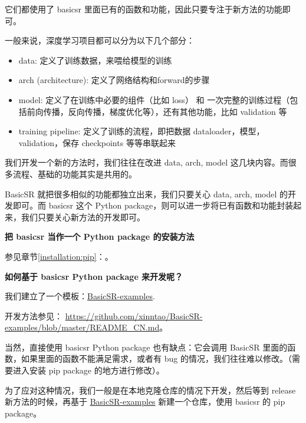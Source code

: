 \documentclass[../main.tex]{subfiles}
\begin{document}
它们都使用了 basicsr 里面已有的函数和功能，因此只要专注于新方法的功能即可。

一般来说，深度学习项目都可以分为以下几个部分：
\begin{itemize}
	\item data: 定义了训练数据，来喂给模型的训练
	\item arch (architecture): 定义了网络结构和forward的步骤
	\item model: 定义了在训练中必要的组件（比如 loss） 和 一次完整的训练过程（包括前向传播，反向传播，梯度优化等），还有其他功能，比如 validation 等
	\item training pipeline: 定义了训练的流程，即把数据 dataloader，模型，validation，保存 checkpoints 等等串联起来
\end{itemize}

我们开发一个新的方法时，我们往往在改进 data, arch, model 这几块内容。而很多流程、基础的功能其实是共用的。

BasicSR 就把很多相似的功能都独立出来，我们只要关心 data, arch, model 的开发即可。而 basicsr 这个 Python package，则可以进一步将已有函数和功能封装起来，我们只要关心新方法的开发即可。


\begin{note} %
	\textbf{把 basicsr 当作一个 Python package 的安装方法}
	
	参见章节\ref{installation:pip}：。
\end{note}

\textbf{}

\begin{note} %
	\textbf{如何基于 basicsr Python package 来开发呢？}
	
	我们建立了一个模板：\href{https://github.com/xinntao/BasicSR-examples}{BasicSR-examples}.
	
	开发方法参见： \url{https://github.com/xinntao/BasicSR-examples/blob/master/README_CN.md}。
\end{note}

当然，直接使用 basicsr Python package 也有缺点：它会调用 BasicSR 里面的函数，如果里面的函数不能满足需求，或者有 bug 的情况，我们往往难以修改。（需要进入安装 pip package 的地方进行修改）。

为了应对这种情况，我们一般是在本地克隆仓库的情况下开发，然后等到 release 新方法的时候，再基于 \href{https://github.com/xinntao/BasicSR-examples}{BasicSR-examples} 新建一个仓库，使用 basicsr 的 pip package。
\end{document}

